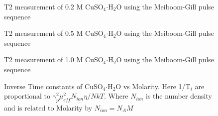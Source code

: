   \begin{figure}[h]
    \resizebox{0.75\textwidth}{!}{}
    \caption{T2 measurement of 0.2 M CuSO$_{4} \boldsymbol{\cdot} $H$_2$O using the Meiboom-Gill pulse sequence }
    \label{figAp:0d2_t2}
  \end{figure}

  \begin{figure}[h]
    \resizebox{0.75\textwidth}{!}{}
    \caption{T2 measurement of 0.5 M CuSO$_{4} \boldsymbol{\cdot} $H$_2$O using the Meiboom-Gill pulse sequence }
    \label{figAp:0d5_t2}
  \end{figure}

  \begin{figure}[h]
    \resizebox{0.75\textwidth}{!}{}
    \caption{T2 measurement of 1.0 M CuSO$_{4} \boldsymbol{\cdot} $H$_2$O using the Meiboom-Gill pulse sequence }
    \label{figAp:1d0_t2}
  \end{figure}



  \begin{figure}[h]
    \resizebox{0.75\textwidth}{!}{}
    \caption{Inverse Time constants of CuSO$_{4} \boldsymbol{\cdot} $H$_2$O vs Molarity. Here 1/T$_i$ are proportional to $\gamma^2_p \mu^2_{eff} N_{ion} \eta / NkT$. Where $N_{ion}$ is the number density and is related to Molarity by $N_{ion} = N_A M$ }
    \label{figAp:cu_linear}
  \end{figure}



  